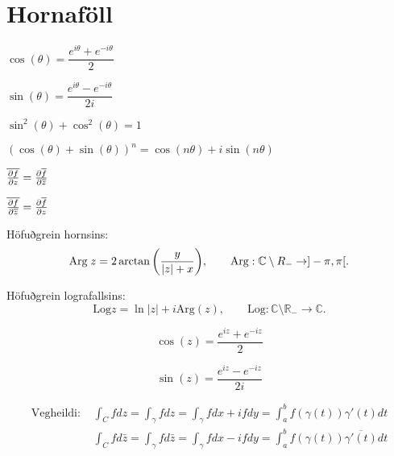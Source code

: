 \noindent
\section*{Hornaföll}

\begin{minipage}{.5\linewidth}
  $\cos(\theta) = \dfrac{e^{i \theta}+e^{-i\theta}}{2}$
\end{minipage}%
\begin{minipage}{.5\linewidth}
	$\sin(\theta) = \dfrac{e^{i \theta}-e^{-i\theta}}{2i}$
\end{minipage}

\begin{minipage}{.5\linewidth}
  $\sin^2(\theta) + \cos^2(\theta) =1$
\end{minipage}%
\begin{minipage}{.5\linewidth}
	$(\cos(\theta)+\sin(\theta))^n = \cos(n\theta)+i\sin(n\theta)$
\end{minipage}

\begin{minipage}{.5\linewidth}
	$\overline {{\frac{\partial f}{\partial z}}} = {\frac{\partial  \overline{f}}{\partial \overline z}}$
\end{minipage}%
\begin{minipage}{.5\linewidth}
	$\overline {{\frac{\partial f}{\partial \overline z}}} = {\frac{\partial \overline{f}}{\partial z}}$
\end{minipage}

\begin{minipage}{1\linewidth}
Höfuðgrein hornsins:
\begin{equation*}
  \text{Arg} \; z = 2 \arctan \bigg(\frac{y}{|z| + x} \biggl), \qquad
		  \text{Arg}: {\mathbb C} \setminus R_- \to ]-\pi,\pi[.
\end{equation*}
\end{minipage}
%
\begin{minipage}{1\linewidth}
\noindent Höfuðgrein lografallsins:
\begin{equation*}
      \text{Log} z = \ln |z| + i \text{Arg}(z), \qquad \text{Log}: \mathbb{C} \setminus \mathbb{R_{-}} \to \mathbb{C}.
\end{equation*}
\end{minipage}

\begin{equation*}
		\cos(z) = \frac{e^{iz}+e^{-iz}}2
\end{equation*}

\begin{equation*}
		\sin(z) = \frac{e^{iz}-e^{-iz}}{2i}
\end{equation*}

\begin{minipage}{1\linewidth}
\begin{align*} \text{Vegheildi: }
&\int_C f dz = \int _{\gamma} fdz =\int_{\gamma}fdx+ ifdy = \int_{a}^{b} f(\gamma(t)) \gamma'(t)dt \\
&\int_C f d\bar{z} = \int _{\gamma} fd\bar{z} =\int_{\gamma}fdx - ifdy = \int_{a}^{b} f(\gamma(t)) \overline{\gamma'(t)}dt
\end{align*}
\end{minipage}

